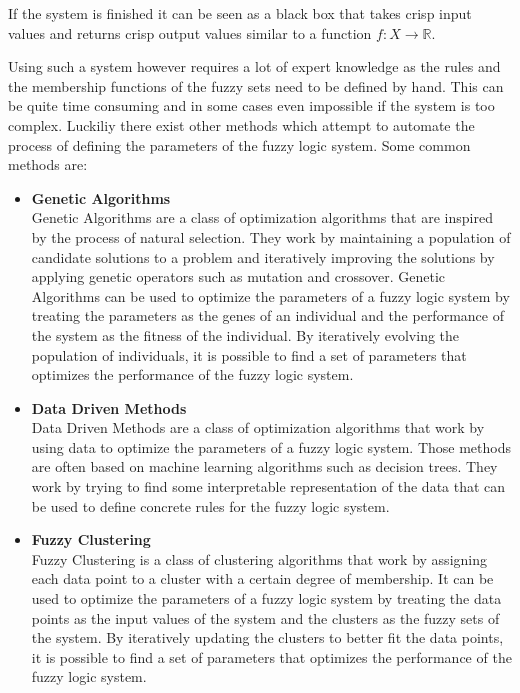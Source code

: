 If the system is finished it can be seen as a black box that takes crisp input values and returns crisp output values similar to a function $f: X \rightarrow \mathbb{R}$.


Using such a system however requires a lot of expert knowledge as the rules and the membership functions of the fuzzy sets need to be defined by hand. This can be quite time consuming and in some cases even impossible if the system is too complex. Luckiliy there exist other methods which attempt to automate the process of defining the parameters of the fuzzy logic system. Some common methods are:

\begin{itemize}
      \item \textbf{Genetic Algorithms} \\
            Genetic Algorithms are a class of optimization algorithms that are inspired by the process of natural selection. They work by maintaining a population of candidate solutions to a problem and iteratively improving the solutions by applying genetic operators such as mutation and crossover. Genetic Algorithms can be used to optimize the parameters of a fuzzy logic system by treating the parameters as the genes of an individual and the performance of the system as the fitness of the individual. By iteratively evolving the population of individuals, it is possible to find a set of parameters that optimizes the performance of the fuzzy logic system.

      \item \textbf{Data Driven Methods} \\
            Data Driven Methods are a class of optimization algorithms that work by using data to optimize the parameters of a fuzzy logic system. Those methods are often based on machine learning algorithms such as decision trees. They work by trying to find some interpretable representation of the data that can be used to define concrete rules for the fuzzy logic system.

      \item \textbf{Fuzzy Clustering} \\
            Fuzzy Clustering is a class of clustering algorithms that work by assigning each data point to a cluster with a certain degree of membership. It can be used to optimize the parameters of a fuzzy logic system by treating the data points as the input values of the system and the clusters as the fuzzy sets of the system. By iteratively updating the clusters to better fit the data points, it is possible to find a set of parameters that optimizes the performance of the fuzzy logic system.
\end{itemize}